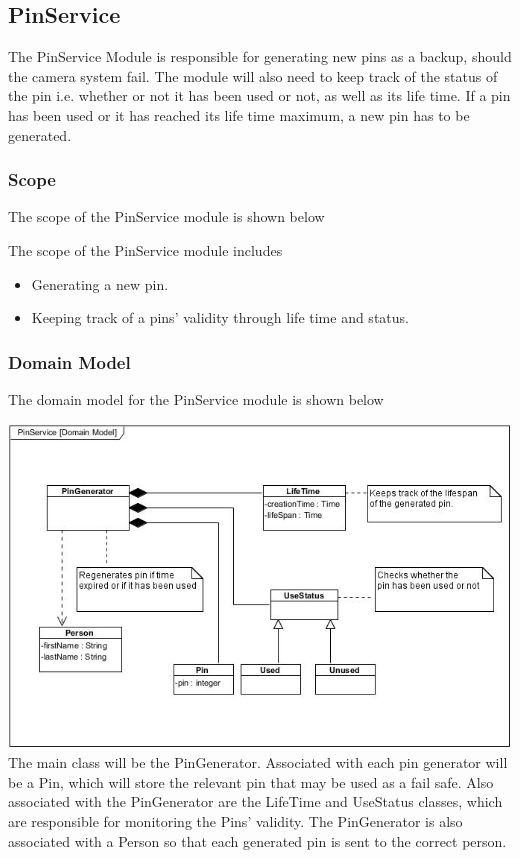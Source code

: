 \documentclass[a4paper,12pt]{article}
\begin{document}
	\newpage
	\subsection{PinService}
	The PinService Module is responsible for generating new pins as a backup, should the camera system fail. The module will also need to keep track of the status of the pin i.e. whether or not it has been used or not, as well as its life time. If a pin has been used or it has reached its life time maximum, a new pin has to be generated.
	
	\subsubsection{Scope}
	The scope of the PinService module is shown below
	
	
	{\noindent}The scope of the PinService module includes
	\begin{itemize}
		\item Generating a new pin.
		\item Keeping track of a pins' validity through life time and status.
	\end{itemize}
	
	\subsubsection{Domain Model}
	The domain model for the PinService module is shown below
	
	\includegraphics[width=1\textwidth]{./Pictures/UML/PinServiceDomain.jpg}\\[0cm]	
	
	{\noindent}The main class will be the PinGenerator. Associated with each pin generator will be a Pin, which will store the relevant pin that may be used as a fail safe. Also associated with the PinGenerator are the LifeTime and UseStatus classes, which are responsible for monitoring the Pins' validity. The PinGenerator is also associated with a Person so that each generated pin is sent to the correct person.
	
\end{document}
